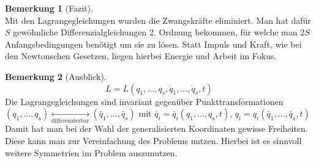 \documentclass[oneside]{book}
\theoremstyle{definition}
\newtheorem*{bemerkung*}{Bemerkung}
\newcommand{\vardots}[2]{#1_1, \dots, #1_#2}
\begin{document}
\begin{bemerkung*}[Fazit]~\\
	Mit den Lagrangegleichungen wurden die Zwangskräfte eliminiert. Man hat dafür $S$ gewöhnliche Differenzialgleichungen 2. Ordnung bekommen, für welche man $2S$ Anfangsbedingungen benötigt um sie zu lösen.
	Statt Impuls und Kraft, wie bei den Newtonschen Gesetzen, liegen hierbei Energie und Arbeit im Fokus.
\end{bemerkung*}

\begin{bemerkung*}[Ausblick]
	$$L = L(\vardots{q}{s}, \vardots{\dot{q}}{s}, t)$$
	Die Lagrangegleichungen sind invariant gegenüber Punkttransformationen \\
	$(\vardots{q}{s}) \underset{\text{differenzierbar}}{\leftrightarrow} (\vardots{\bar{q}}{s})$ mit $\bar{q}_i = \bar{q}_i(\vardots{q}{s}, t)$, $q_i = q_i(\vardots{\bar{q}}{s}, t)$
	Damit hat man bei der Wahl der generalisierten Koordinaten gewisse Freiheiten. Diese kann man zur Vereinfachung des Problems nutzen. Hierbei ist es sinnvoll weitere Symmetrien im Problem auszunutzen.
\end{bemerkung*}
\end{document}
